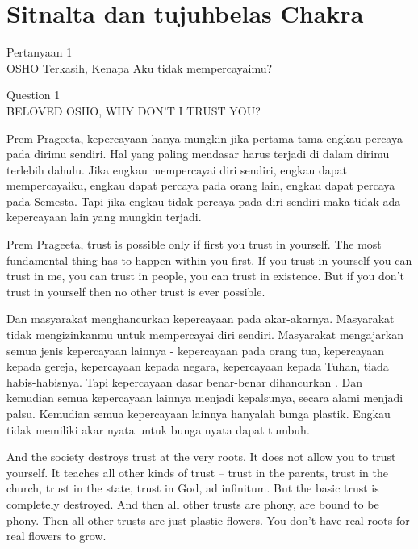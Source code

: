 \chapter{Sitnalta dan tujuhbelas Chakra}

\bahasa
Pertanyaan 1\\
OSHO Terkasih, Kenapa Aku tidak mempercayaimu?

\english
Question 1\\
BELOVED OSHO, WHY DON'T I TRUST YOU?

\bahasa
Prem Prageeta, kepercayaan hanya mungkin jika pertama-tama engkau percaya pada dirimu sendiri. Hal yang paling mendasar harus terjadi di dalam dirimu terlebih dahulu. Jika engkau mempercayai diri sendiri, engkau dapat mempercayaiku, engkau dapat percaya pada orang lain, engkau dapat percaya pada Semesta. Tapi jika engkau tidak percaya pada diri sendiri maka tidak ada kepercayaan lain yang mungkin terjadi.

\english
Prem Prageeta, trust is possible only if first you trust in yourself. The most fundamental thing has to happen within you first. If you trust in yourself you can trust in me, you can trust in people, you can trust in existence. But if you don't trust in yourself then no other trust is ever possible.

\bahasa
Dan masyarakat menghancurkan kepercayaan pada akar-akarnya. Masyarakat tidak mengizinkanmu untuk mempercayai diri sendiri. Masyarakat mengajarkan semua jenis kepercayaan lainnya - kepercayaan pada orang tua, kepercayaan kepada gereja, kepercayaan kepada negara, kepercayaan kepada Tuhan, tiada habis-habisnya. Tapi kepercayaan dasar benar-benar dihancurkan . Dan kemudian semua kepercayaan lainnya menjadi kepalsunya, secara alami menjadi palsu. Kemudian semua kepercayaan lainnya hanyalah bunga plastik. Engkau tidak memiliki akar nyata untuk bunga nyata dapat tumbuh.

\english
And the society destroys trust at the very roots. It does not allow you to trust yourself. It teaches all other kinds of trust -- trust in the parents, trust in the church, trust in the state, trust in God, ad infinitum. But the basic trust is completely destroyed. And then all other trusts are phony, are bound to be phony. Then all other trusts are just plastic flowers. You
don't have real roots for real flowers to grow.

\bahasa



